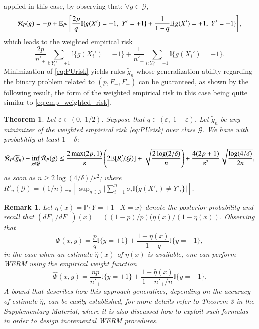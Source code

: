 \documentclass[12pt]{article}
\newtheorem{theorem}{{\bf Theorem}}
\newtheorem{remark}{{\bf Remark}}
\newcommand{\cR}{{\cal R}}
\begin{document}
applied in this case, by observing that: $\forall g\in \mathcal{G}$,
\begin{equation}
\cR_P(g)=-p+\mathbb{E}_{P'}\left[ \frac{2p}{q}\mathbb{I}\{g(X')=-1,\; Y'=+1  \} + \frac{1}{1-q} \mathbb{I}\{g(X')=+1,\; Y'=-1  \} \right],
\end{equation}
which leads to the weighted empirical risk
\begin{equation}\label{eq:PUrisk}
\frac{2p}{n'_+}\sum_{i:Y_i'=+1}\mathbb{I}\{g(X_i')=-1  \} + \frac{1}{n'_-}\sum_{i:Y_i'=-1} \mathbb{I}\{g(X_i')=+1  \}.
\end{equation}
Minimization of \eqref{eq:PUrisk} yields rules $\widetilde{g}_n$ whose generalization ability regarding the binary problem related to $(p,F_+,F_-)$ can be guaranteed, as shown by the following result, the form of the weighted empirical risk in this case being quite similar to \eqref{eq:emp_weighted_risk}.
\begin{theorem}
\label{th:excess_risk_PU}
Let $\varepsilon\in(0,\; 1/2)$. Suppose that $q\in (\varepsilon,\; 1-\varepsilon)$. Let $\widetilde{g}_n$ be any minimizer of
the weighted empirical risk \eqref{eq:PUrisk} over class $\mathcal{G}$.
We have with probability at least $1- \delta$:
\begin{equation*}
    \cR_P (\widetilde{g}_n) - \inf_{g\in \mathcal{G}}\cR_P(g)
    \leq \frac{2\max(2 p, 1) }{\varepsilon}
    \left( 2 \mathbb{E}[R'_n(\mathcal{G})  ]     +\sqrt{\frac{2\log(2/\delta)}{n}} \right)
+ \frac{4(2p+1)}{\varepsilon^2} \sqrt{\frac{\log (4/\delta)}{2n}},
\end{equation*}
as soon as $n\geq 2\log(4/\delta)/\varepsilon^2$; where $R'_n(\mathcal{G})=(1/n)\mathbb{E}_{\mathbf{\sigma}}[\sup_{g\in \mathcal{G}}\vert \sum_{i=1}^n\sigma_i \mathbb{I}\{g(X'_i)\neq Y'_i\} \vert]$.
\end{theorem}

\begin{remark}
Let $\eta(x)=\mathbb{P}\{Y=+1\mid X=x  \}$ denote the posterior probability and recall that $(dF_+/dF_-)(x)=((1-p)/p)(\eta(x)/(1-\eta(x))$. Observing that
\begin{equation}
  \label{eq:PhiPU}
\Phi(x,y) = \frac{p}{q}\mathbb{I}\{y=+1 \}+ \frac{1-\eta(x)}{1-q}\mathbb{I}\{y=-1 \},
\end{equation}
in the case when an estimate $\widehat{\eta}(x)$ of $\eta(x)$ is available, one can perform WERM using the empirical weight function
\begin{equation}
  \label{eq:phi_pu_eta}
\widehat{\Phi}(x,y) = \frac{np}{n'_+}\mathbb{I}\{y=+1 \}+ \frac{1-\widehat{\eta}(x)}{1-n'_+/n}\mathbb{I}\{y=-1 \}.
\end{equation}
A bound that describes how this approach generalizes, depending on the accuracy
of estimate $\widehat{\eta}$, can be easily established, for more details refer
to Theorem 3 in the Supplementary Material, where it is also discussed how to
exploit such formulas in order to design incremental WERM procedures.
\end{remark}
\end{document}
